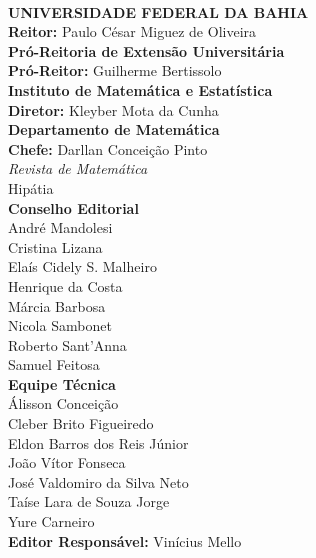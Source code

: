\documentclass[onecolumn]{hipatia}
\begin{document}
\newpage
~
\newpage
\pagecolor{white}
\begin{center}
  \textbf{UNIVERSIDADE FEDERAL DA BAHIA} \\
  \textbf{Reitor:} Paulo César Miguez de Oliveira\\
\vspace*{0.5cm}
  \textbf{Pró-Reitoria de Extensão Universitária} \\
  \textbf{Pró-Reitor:} Guilherme Bertissolo\\
  \vspace*{0.5cm}  
  \textbf{Instituto de Matemática e Estatística} \\
  \textbf{Diretor:} Kleyber Mota da Cunha\\
  \vspace*{0.5cm}
  \textbf{Departamento de Matemática} \\
  \textbf{Chefe:} Darllan Conceição Pinto\\
\vspace*{2cm}
{\fontsize{23}{23}\selectfont\textit{Revista de Matemática}}\\
\vspace*{0.3cm}
{\fontsize{72}{72}\selectfont Hipátia}\\
\vspace*{0.8cm}
\textbf{Conselho Editorial} \\
André Mandolesi\\
Cristina Lizana\\
Elaís Cidely S. Malheiro\\
Henrique da Costa\\
Márcia Barbosa\\
Nicola Sambonet\\
Roberto Sant'Anna\\
Samuel Feitosa\\
\vspace*{0.2cm}
\textbf{Equipe Técnica} \\
Álisson Conceição\\
Cleber Brito Figueiredo\\
Eldon Barros dos Reis Júnior\\
João Vítor Fonseca \\
José Valdomiro da Silva Neto\\
Taíse Lara de Souza Jorge\\
Yure Carneiro\\
\vspace*{0.3cm}
\textbf{Editor Responsável:} Vinícius Mello  \\


\end{center}
\end{document}
